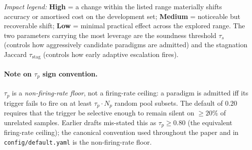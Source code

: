 \textit{Impact legend:} \textbf{High} = a change within the listed range materially shifts accuracy or amortised cost on the development set; \textbf{Medium} = noticeable but recoverable shift; \textbf{Low} = minimal practical effect across the explored range. The two parameters carrying the most leverage are the soundness threshold $\tau_s$ (controls how aggressively candidate paradigms are admitted) and the stagnation Jaccard $\tau_{\text{stag}}$ (controls how early adaptive escalation fires).

\paragraph{Note on $\tau_p$ sign convention.} $\tau_p$ is a \emph{non-firing-rate floor}, not a firing-rate ceiling: a paradigm is admitted iff its trigger fails to fire on at least $\tau_p \cdot N_p$ random pool subsets. The default of $0.20$ requires that the trigger be selective enough to remain silent on $\geq 20\%$ of unrelated samples. Earlier drafts mis-stated this as $\tau_p \geq 0.80$ (the equivalent firing-rate ceiling); the canonical convention used throughout the paper and in \texttt{config/default.yaml} is the non-firing-rate floor.

